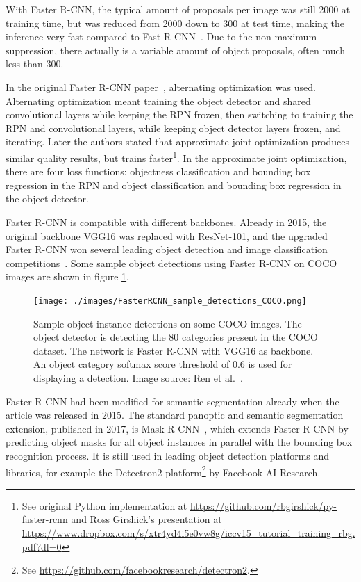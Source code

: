 \documentclass[english,twoside,openright]{HYgraduMLDS}
\begin{document}
With Faster R-CNN, the typical amount of proposals per image was still 2000 at training time, but was reduced from 2000 down to 300 at test time, making the inference very fast compared to Fast R-CNN~\cite{FasterRCNN}. Due to the non-maximum suppression, there actually is a variable amount of object proposals, often much less than 300. 

In the original Faster R-CNN paper~\cite{FasterRCNN}, alternating optimization was used. Alternating optimization meant training the object detector and shared convolutional layers while keeping the RPN frozen, then switching to training the RPN and convolutional layers, while keeping object detector layers frozen, and iterating. Later the authors stated that approximate joint optimization produces similar quality results, but trains faster\footnote{See original Python implementation at \url{https://github.com/rbgirshick/py-faster-rcnn} and Ross Girshick's presentation at \url{https://www.dropbox.com/s/xtr4yd4i5e0vw8g/iccv15_tutorial_training_rbg.pdf?dl=0}}. In the approximate joint optimization, there are four loss functions: objectness classification and bounding box regression in the RPN and object classification and bounding box regression in the object detector. 

Faster R-CNN is compatible with different backbones. Already in 2015, the original backbone VGG16 was replaced with ResNet-101, and the upgraded Faster R-CNN won several leading object detection and image classification competitions~\cite{FasterRCNN}. Some sample object detections using Faster R-CNN on COCO images are shown in figure \ref{fig:sample_detections_Faster_R-CNN}.

\begin{figure}[h] 
\centering
\texttt{[image: ./images/FasterRCNN\_sample\_detections\_COCO.png]}
\caption{Sample object instance detections on some COCO images. The object detector is detecting the 80 categories present in the COCO dataset. The network is Faster R-CNN with VGG16 as backbone. An object category softmax score threshold of 0.6 is used for displaying a detection. Image source: Ren et al.~\cite{FasterRCNN}.}
\label{fig:sample_detections_Faster_R-CNN} 
\end{figure}

Faster R-CNN had been modified for semantic segmentation already when the article was released in 2015. The standard panoptic and semantic segmentation extension, published in 2017, is Mask R-CNN~\cite{MaskRCNN}, which extends Faster R-CNN by predicting object masks for all object instances in parallel with the bounding box recognition process. It is still used in leading object detection platforms and libraries, for example the Detectron2 platform\footnote{See \url{https://github.com/facebookresearch/detectron2}.} by Facebook AI Research.
\end{document}
